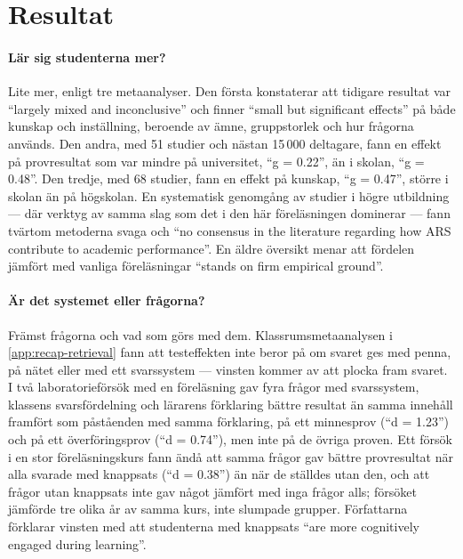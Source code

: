 \section{Resultat}
\label{sec:recap-polls-resultat}

\paragraph{Lär sig studenterna mer?}
Lite mer, enligt tre metaanalyser.  Den första konstaterar att tidigare
resultat var \enquote{largely mixed and inconclusive} och finner
\enquote{small but significant effects} på både kunskap och inställning,
beroende av ämne, gruppstorlek och hur frågorna
används\autocite{Hunsu2016Clickers}.
Den andra, med 51 studier och nästan 15\,000 deltagare, fann en effekt
på provresultat som var mindre på universitet, \enquote{g = 0.22}, än i
skolan, \enquote{g = 0.48}\autocite[109]{CastilloManzano2016ARS}.  Den tredje,
med 68 studier, fann en effekt på kunskap, \enquote{g = 0.47},
större i skolan än på högskolan\autocite{Akbay2024ARS}.  En
systematisk genomgång av studier i högre utbildning --- där verktyg av
samma slag som det i den här föreläsningen dominerar --- fann tvärtom
metoderna svaga och \enquote{no consensus in the literature regarding
how ARS contribute to academic performance}\autocite{SerradaSotil2025ARS}.
En äldre översikt menar att fördelen jämfört med vanliga föreläsningar
\enquote{stands on firm empirical ground}\autocite{Chien2016Clickers}.

\paragraph{Är det systemet eller frågorna?}
Främst frågorna och vad som görs med dem.  Klassrumsmetaanalysen i
\cref{app:recap-retrieval} fann att testeffekten inte beror på om svaret
ges med penna, på nätet eller med ett svarssystem\autocite{Yang2021Testing}
--- vinsten kommer av att plocka fram svaret.  I två
laboratorieförsök med en föreläsning gav fyra frågor med svarssystem,
klassens svarsfördelning och lärarens förklaring bättre resultat än
samma innehåll framfört som påståenden med samma förklaring, på ett
minnesprov (\enquote{d = 1.23}) och på ett överföringsprov
(\enquote{d = 0.74}), men inte på de övriga
proven\autocite{CampbellMayer2009Questioning}.
Ett försök i en stor
föreläsningskurs fann ändå att samma frågor gav bättre provresultat när
alla svarade med knappsats (\enquote{d = 0.38}) än när de ställdes utan
den, och att frågor utan knappsats inte gav något jämfört med inga
frågor alls\autocite{Mayer2009Clickers}; försöket jämförde tre olika år
av samma kurs, inte slumpade grupper.  Författarna förklarar vinsten
med att studenterna med knappsats \enquote{are more cognitively engaged
during learning}\autocite{Mayer2009Clickers}.

